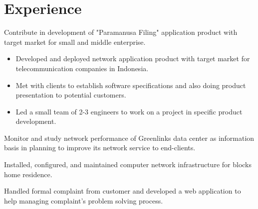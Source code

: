 \documentclass[10pt, a4paper]{moderncv}
\begin{document}
\section{Experience}
{ 
    \begin{scriptsize} 
        Contribute in development of "Paramanusa Filing" application product with target market for small and middle enterprise.
    \end{scriptsize}
}
{ 
    \begin{itemize} 
        \item Developed and deployed network application product with target market for telecommunication companies in Indonesia.
        \item Met with clients to establish software specifications and also doing product presentation to potential customers.
        \item Led a small team of 2-3 engineers to work on a project in specific product development.
    \end{itemize}
}
{
    \begin{scriptsize}
        Monitor and study network performance of Greenlinks data center as information basis in planning to improve its network
        service to end-clients.
    \end{scriptsize}
}
{
    \begin{scriptsize}
        Installed, configured, and maintained computer network infrastructure for blocks home residence.
    \end{scriptsize}
}
{
    \begin{scriptsize}
        Handled formal complaint from customer and developed a web application to help managing complaint's problem solving process.
    \end{scriptsize}
}
\end{document}
